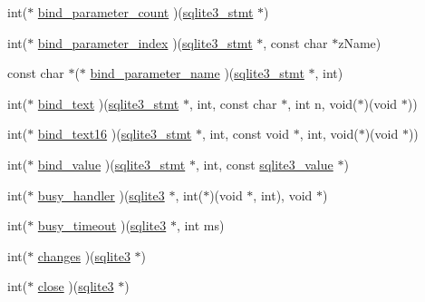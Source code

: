 \begin{DoxyCompactItemize}
\item 
int($\ast$ \hyperlink{structsqlite3__api__routines_acd345a944505eb7928568f01d7a4fe5a}{bind\+\_\+parameter\+\_\+count} )(\hyperlink{sqlite3_8h_af2a033da1327cdd77f0a174a09aedd0c}{sqlite3\+\_\+stmt} $\ast$)
\item 
int($\ast$ \hyperlink{structsqlite3__api__routines_af4ade5152fd51b1311463014b48dd05d}{bind\+\_\+parameter\+\_\+index} )(\hyperlink{sqlite3_8h_af2a033da1327cdd77f0a174a09aedd0c}{sqlite3\+\_\+stmt} $\ast$, const char $\ast$z\+Name)
\item 
const char $\ast$($\ast$ \hyperlink{structsqlite3__api__routines_a9d8e99fd21fd5929fc6c254060d8f83b}{bind\+\_\+parameter\+\_\+name} )(\hyperlink{sqlite3_8h_af2a033da1327cdd77f0a174a09aedd0c}{sqlite3\+\_\+stmt} $\ast$, int)
\item 
int($\ast$ \hyperlink{structsqlite3__api__routines_a0b489499ca3b7e212d25ea8a86d38f0e}{bind\+\_\+text} )(\hyperlink{sqlite3_8h_af2a033da1327cdd77f0a174a09aedd0c}{sqlite3\+\_\+stmt} $\ast$, int, const char $\ast$, int n, void($\ast$)(void $\ast$))
\item 
int($\ast$ \hyperlink{structsqlite3__api__routines_ab6ad28704caf8337cf5a395154e8941c}{bind\+\_\+text16} )(\hyperlink{sqlite3_8h_af2a033da1327cdd77f0a174a09aedd0c}{sqlite3\+\_\+stmt} $\ast$, int, const void $\ast$, int, void($\ast$)(void $\ast$))
\item 
int($\ast$ \hyperlink{structsqlite3__api__routines_a8f3424b59d6bbc836c233a44a2fd9a36}{bind\+\_\+value} )(\hyperlink{sqlite3_8h_af2a033da1327cdd77f0a174a09aedd0c}{sqlite3\+\_\+stmt} $\ast$, int, const \hyperlink{sqlite3_8h_ac2fa1ecdb2290d9af6010edbd1cbc83c}{sqlite3\+\_\+value} $\ast$)
\item 
int($\ast$ \hyperlink{structsqlite3__api__routines_ad7b688e04d388cdeb13d4c06fedb1c46}{busy\+\_\+handler} )(\hyperlink{sqlite3_8h_a0ef6f2646262c8a9b24368d8ac140f69}{sqlite3} $\ast$, int($\ast$)(void $\ast$, int), void $\ast$)
\item 
int($\ast$ \hyperlink{structsqlite3__api__routines_a8a4a2ccc0c7587e6c5c4db5f4b03246b}{busy\+\_\+timeout} )(\hyperlink{sqlite3_8h_a0ef6f2646262c8a9b24368d8ac140f69}{sqlite3} $\ast$, int ms)
\item 
int($\ast$ \hyperlink{structsqlite3__api__routines_aef4d7748f5708731e0aaf54dbfbbec33}{changes} )(\hyperlink{sqlite3_8h_a0ef6f2646262c8a9b24368d8ac140f69}{sqlite3} $\ast$)
\item 
int($\ast$ \hyperlink{structsqlite3__api__routines_a5c30292eef0130d7e8a408c4e3396012}{close} )(\hyperlink{sqlite3_8h_a0ef6f2646262c8a9b24368d8ac140f69}{sqlite3} $\ast$)

\end{DoxyCompactItemize}
